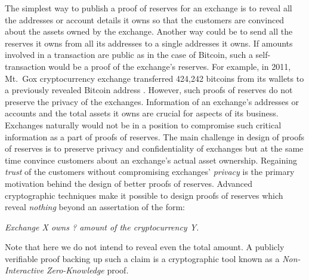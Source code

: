 \begin{Abstract}
The simplest way to publish a proof of reserves for an exchange is to reveal all the addresses or account details it owns so that the customers are convinced about the assets owned by the exchange.
Another way could be to send all the reserves it owns from all its addresses to a single addresses it owns.
If amounts involved in a transaction are public as in the case of Bitcoin, such a self-transaction would be a proof of the exchange's reserves.
For example, in 2011, Mt.~Gox cryptocurrency exchange transferred 424,242 bitcoins from its wallets to a previously revealed Bitcoin address \cite{MtGoxWikipedia}.
However, such proofs of reserves do not preserve the privacy of the exchanges. 
Information of an exchange's addresses or accounts and the total assets it owns are crucial for aspects of its business.
Exchanges naturally would not be in a position to compromise such critical information as a part of proofs of reserves.
The main challenge in design of proofs of reserves is to preserve privacy and confidentiality of exchanges but at the same time convince customers about an exchange's actual asset ownership.
Regaining \textit{trust} of the customers without compromising exchanges' \textit{privacy} is the primary motivation behind the design of better proofs of reserves. 
Advanced cryptographic techniques make it possible to design proofs of reserves which reveal \textit{nothing} beyond an assertation of the form:
\begin{center}
    \textit{Exchange X owns ? amount of the cryptocurrency Y.}
\end{center}
Note that here we do not intend to reveal even the total amount. 
A publicly verifiable proof backing up such a claim is a cryptographic tool known as a \textit{Non-Interactive Zero-Knowledge} proof.


\end{Abstract}
